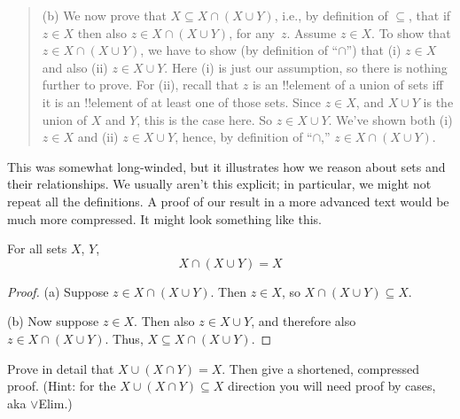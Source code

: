 \documentclass[../../../include/open-logic-section]{subfiles}
\begin{document}
\begin{explain}
\begin{quote}
(b) We now prove that $X \subseteq X \cap (X \cup Y)$, i.e., by
definition of $\subseteq$, that if $z \in X$ then also $z \in X \cap
(X \cup Y)$, for any~$z$.  Assume $z \in X$.  To show that $z \in X
\cap (X \cup Y)$, we have to show (by definition of ``$\cap$'') that
(i) $z \in X$ and also (ii) $z \in X \cup Y$.  Here (i) is just our
assumption, so there is nothing further to prove.  For (ii), recall that $z$
is an !!{element} of a union of sets iff it is an !!{element} of at least
one of those sets.  Since $z \in X$, and $X \cup Y$ is the union of
$X$ and $Y$, this is the case here.  So $z \in X \cup Y$.  We've shown
both (i) $z \in X$ and (ii) $z \in X \cup Y$, hence, by definition of
``$\cap$,'' $z \in X \cap (X \cup Y)$.
\end{quote}

This was somewhat long-winded, but it illustrates how we reason about
sets and their relationships.  We usually aren't this explicit; in
particular, we might not repeat all the definitions.  A proof of our
result in a more advanced text would be much more compressed. It might
look something like this.
\end{explain}


\begin{prop}[Absorption]
For all sets $X$, $Y$,
\[
X \cap (X \cup Y) = X
\]
\end{prop}

\begin{proof}
(a) Suppose $z \in X \cap (X \cup Y)$.  Then $z \in X$, so $X \cap (X
  \cup Y) \subseteq X$.

(b) Now suppose $z \in X$.  Then also $z \in X \cup Y$, and therefore
  also $z \in X \cap (X \cup Y)$.  Thus, $X \subseteq X \cap (X \cup
  Y)$.
\end{proof}

\begin{prob}
Prove in detail that $X \cup (X \cap Y) = X$.  Then give a shortened,
compressed proof. (Hint: for the $X \cup (X \cap Y) \subseteq X$
direction you will need proof by cases, aka $\lor$Elim.)
\end{prob}
\end{document}
